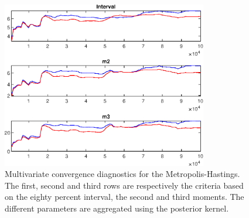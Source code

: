  
\begin{figure}[H]
\centering 
\includegraphics[width=0.8\textwidth]{BRS_growth_util/Output/BRS_growth_util_mdiag}
\caption{Multivariate convergence diagnostics for the Metropolis-Hastings.
The first, second and third rows are respectively the criteria based on
the eighty percent interval, the second and third moments. The different 
parameters are aggregated using the posterior kernel.}\label{Fig:MultivariateDiagnostics}
\end{figure}


